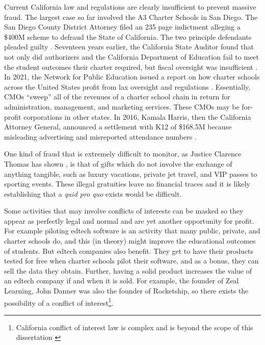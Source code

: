 Current California law and regulations are clearly insufficient to prevent massive fraud. The largest case so far involved the A3 Charter Schools in San Diego. The San Diego County District Attorney filed an 235 page indictment \parencite{SDDA2019} alleging a \$400M scheme to defraud the State of California. The two principle defendants pleaded guilty \parencite{Taketa2021}.
Seventeen years earlier, the California State Auditor found that not only did authorizers and the California Department of Education fail to meet the student outcomes their charter required, but fiscal oversight was insufficient \parencite{CAStateAuditor2002}. In 2021, the Network for Public Education issued a report on how charter schools across the United States profit from lax oversight and regulations \parencite{Burris.Cimarusti2021}. Essentially, CMOs ``sweep'' all of the revenues of a charter school chain in return for administration, management, and marketing services. These CMOs may be for-profit corporations in other states. In 2016, Kamala Harris, then the California Attorney General, announced a settlement with K12 of \$168.5M because misleading advertising and misreported attendance numbers \parencite{Agpressoffice2016}.

One kind of fraud that is extremely difficult to monitor, as Justice Clarence Thomas has shown \parencite{Murphy.Mierjeski2023}, is that of gifts which do not involve the exchange of anything tangible, such as luxury vacations, private jet travel, and VIP passes to sporting events. These illegal gratuities leave no financial traces and it is likely establishing that a \textit{quid pro quo} exists would be difficult.

Some activities that may involve conflicts of interests can be masked so they appear as perfectly legal and normal and are yet another opportunity for profit. For example piloting edtech software is an activity that many public, private, and charter schools do, and this (in theory) might improve the educational outcomes of students. But edtech companies also benefit. They get to have their products tested for free when charter schools pilot their software, and as a bonus, they can sell the data they obtain. Further, having a solid product increases the value of an edtech company if and when it is sold. For example, the founder of Zeal Learning, John Danner was also the founder of Rocketship, so there exists the possibility of a conflict of interest\footnote{California conflict of interest law is complex and is beyond the scope of this dissertation \parencite{Chaney.etal2010}}.

